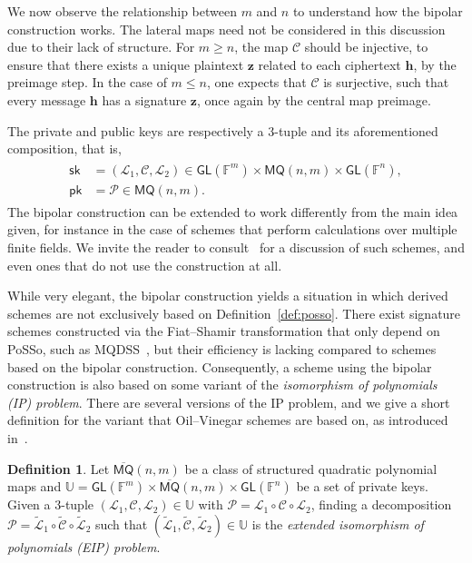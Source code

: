 \documentclass[12pt, a4paper, oneside]{memoir}
\theoremstyle{definition}
\newtheorem{definition}[theorem]{Definition}
\begin{document}
We now observe the relationship between $m$ and $n$ to understand how the bipolar construction works. The lateral maps need not be considered in this discussion due to their lack of structure. For $m \geq n$, the map $\mathcal{C}$ should be injective, to ensure that there exists a unique plaintext $\mathbf{z}$ related to each ciphertext $\mathbf{h}$, by the preimage step. In the case of $m \leq n$, one expects that $\mathcal{C}$ is surjective, such that every message $\mathbf{h}$ has a signature $\mathbf{z}$, once again by the central map preimage.

The private and public keys are respectively a $3$-tuple and its aforementioned composition, that is,
\begin{align}
  \begin{split}
    \mathsf{sk} &= (\mathcal{L}_{1}, \mathcal{C}, \mathcal{L}_{2}) 
      \in \mathsf{GL}(\mathbb{F}^{m}) \times \mathsf{MQ}(n, m) \times \mathsf{GL}(\mathbb{F}^{n}), \\
    \mathsf{pk} &= \mathcal{P} \in \mathsf{MQ}(n, m).
  \end{split}
\end{align}
The bipolar construction can be extended to work differently from the main idea given, for instance in the case of schemes that perform calculations over multiple finite fields. We invite the reader to consult~\cite[Sec.~2.2]{Petzoldt:201307} for a discussion of such schemes, and even ones that do not use the construction at all.

While very elegant, the bipolar construction yields a situation in which derived schemes are not exclusively based on Definition~\ref{def:posso}. There exist signature schemes constructed via the Fiat--Shamir transformation that only depend on \textsf{PoSSo}, such as MQDSS~\cite{Chen:201612}, but their efficiency is lacking compared to schemes based on the bipolar construction. Consequently, a scheme using the bipolar construction is also based on some variant of the \emph{isomorphism of polynomials (IP) problem}. There are several versions of the IP problem, and we give a short definition for the variant that Oil--Vinegar schemes are based on, as introduced in~\cite{Ding:200806}.

\begin{definition}\label{def:eip}
  Let $\overline{\mathsf{MQ}}(n, m)$ be a class of structured quadratic polynomial maps and $\mathbb{U} = \mathsf{GL}(\mathbb{F}^{m}) \times \overline{\mathsf{MQ}}(n, m) \times \mathsf{GL}(\mathbb{F}^{n})$ be a set of private keys. Given a $3$-tuple $(\mathcal{L}_{1}, \mathcal{C}, \mathcal{L}_{2}) \in \mathbb{U}$ with $\mathcal{P} = \mathcal{L}_{1} \circ \mathcal{C} \circ \mathcal{L}_{2}$, finding a decomposition $\mathcal{P} = \widetilde{\mathcal{L}}_{1} \circ \widetilde{\mathcal{C}} \circ \widetilde{\mathcal{L}}_{2}$ such that $(\widetilde{\mathcal{L}}_{1}, \widetilde{\mathcal{C}}, \widetilde{\mathcal{L}}_{2}) \in \mathbb{U}$ is the \emph{extended isomorphism of polynomials (EIP) problem}.
\end{definition}
\end{document}
